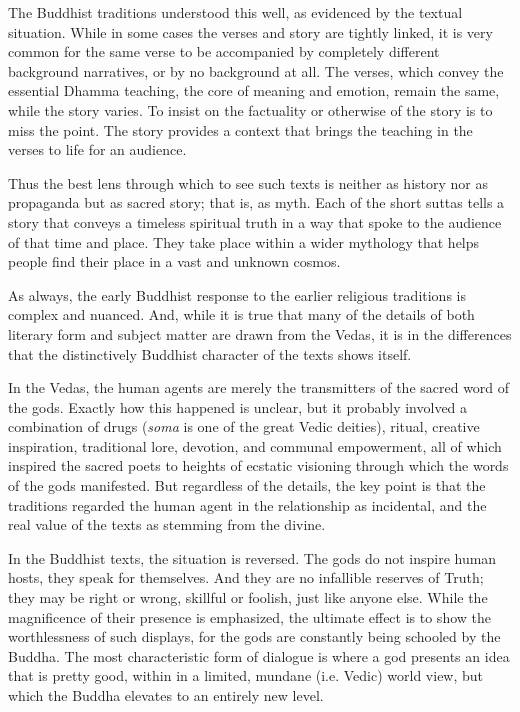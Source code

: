 \documentclass[12pt,openany]{book}%
\begin{document}
The Buddhist traditions understood this well, as evidenced by the textual situation. While in some cases the verses and story are tightly linked, it is very common for the same verse to be accompanied by completely different background narratives, or by no background at all. The verses, which convey the essential Dhamma teaching, the core of meaning and emotion, remain the same, while the story varies. To insist on the factuality or otherwise of the story is to miss the point. The story provides a context that brings the teaching in the verses to life for an audience.

Thus the best lens through which to see such texts is neither as history nor as propaganda but as sacred story; that is, as myth. Each of the short suttas tells a story that conveys a timeless spiritual truth in a way that spoke to the audience of that time and place. They take place within a wider mythology that helps people find their place in a vast and unknown cosmos.

As always, the early Buddhist response to the earlier religious traditions is complex and nuanced. And, while it is true that many of the details of both literary form and subject matter are drawn from the Vedas, it is in the differences that the distinctively Buddhist character of the texts shows itself.

In the Vedas, the human agents are merely the transmitters of the sacred word of the gods. Exactly how this happened is unclear, but it probably involved a combination of drugs (\textit{soma} is one of the great Vedic deities), ritual, creative inspiration, traditional lore, devotion, and communal empowerment, all of which inspired the sacred poets to heights of ecstatic visioning through which the words of the gods manifested. But regardless of the details, the key point is that the traditions regarded the human agent in the relationship as incidental, and the real value of the texts as stemming from the divine.

In the Buddhist texts, the situation is reversed. The gods do not inspire human hosts, they speak for themselves. And they are no infallible reserves of Truth; they may be right or wrong, skillful or foolish, just like anyone else. While the magnificence of their presence is emphasized, the ultimate effect is to show the worthlessness of such displays, for the gods are constantly being schooled by the Buddha. The most characteristic form of dialogue is where a god presents an idea that is pretty good, within in a limited, mundane (i.e. Vedic) world view, but which the Buddha elevates to an entirely new level.
\end{document}
